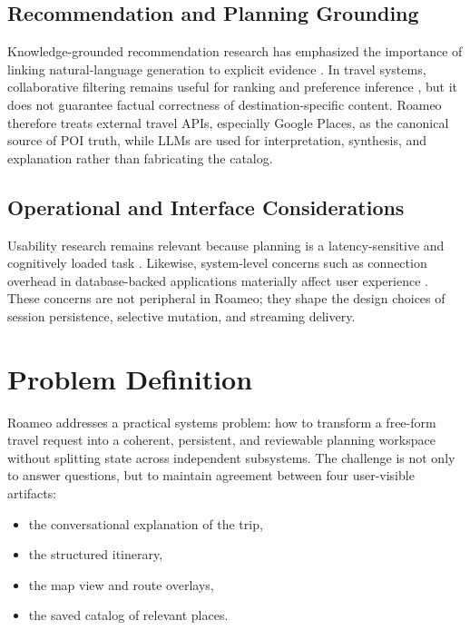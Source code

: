 \documentclass[conference]{IEEEtran}
\begin{document}
\subsection{Recommendation and Planning Grounding}

Knowledge-grounded recommendation research has emphasized the importance of linking natural-language generation to explicit evidence \cite{zheng2023chatrec}. In travel systems, collaborative filtering remains useful for ranking and preference inference \cite{koren2009matrix}, but it does not guarantee factual correctness of destination-specific content. Roameo therefore treats external travel APIs, especially Google Places, as the canonical source of POI truth, while LLMs are used for interpretation, synthesis, and explanation rather than fabricating the catalog.

\subsection{Operational and Interface Considerations}

Usability research remains relevant because planning is a latency-sensitive and cognitively loaded task \cite{nielsen1993usability}. Likewise, system-level concerns such as connection overhead in database-backed applications materially affect user experience \cite{nance2011connection}. These concerns are not peripheral in Roameo; they shape the design choices of session persistence, selective mutation, and streaming delivery.

\section{Problem Definition}

Roameo addresses a practical systems problem: how to transform a free-form travel request into a coherent, persistent, and reviewable planning workspace without splitting state across independent subsystems. The challenge is not only to answer questions, but to maintain agreement between four user-visible artifacts:

\begin{itemize}
  \item the conversational explanation of the trip,
  \item the structured itinerary,
  \item the map view and route overlays,
  \item the saved catalog of relevant places.
\end{itemize}
\end{document}
